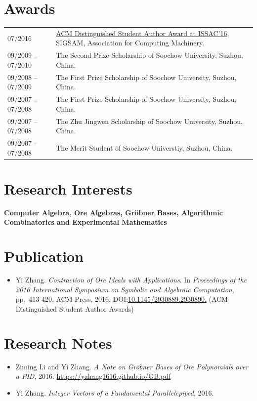 \documentclass[a4paper,12pt]{article}
\begin{document}
\section*{\Large{Awards}}

\begin{tabular}{@{}p{1.4in}p{4in}}
07/2016               & \href{https://www.sigsam.org/Awards/ISSACAwards.html}{ACM Distinguished Student Author Award at ISSAC'16}, SIGSAM, Association for Computing Machinery. \\
09/2009 -- 07/2010    & The Second Prize Scholarship of Soochow University, Suzhou, China.\\
09/2008 -- 07/2009    & The First Prize Scholarship of Soochow University, Suzhou, China. \\
09/2007 -- 07/2008    & The First Prize Scholarship of Soochow University, Suzhou, China. \\ 
09/2007 -- 07/2008    & The Zhu Jingwen Scholarship of Soochow University, Suzhou, China. \\
09/2007 -- 07/2008    & The Merit Student of Soochow Universtiy, Suzhou, China. 
\end{tabular}

\section*{\Large{Research Interests}}
{\bf Computer Algebra, Ore Algebras, Gr\"{o}bner Bases, Algorithmic Combinatorics and Experimental Mathematics}

\section*{\Large{Publication}}
\begin{itemize}
 \item Yi Zhang. {\em Contraction of Ore Ideals with Applications}. 
       In {\em Proceedings of the 2016 International Symposium on Symbolic and Algebraic Computation}, 
       pp.\ 413-420, ACM Press, 2016. DOI:\href{http://dl.acm.org/citation.cfm?id=2930890}{10.1145/2930889.2930890.} 
       (ACM Distinguished Student Author Awards)
\end{itemize}

\section*{\Large{Research Notes}}
\begin{itemize}
 \item Ziming Li and Yi Zhang. {\em A Note on Gr\"{o}bner Bases of Ore Polynomials over a PID}, 2016. 
 \url{https://yzhang1616.github.io/GB.pdf} 
 \item Yi Zhang. {\em Integer Vectors of a Fundamental Parallelepiped}, 2016.
\end{itemize}
\end{document}
